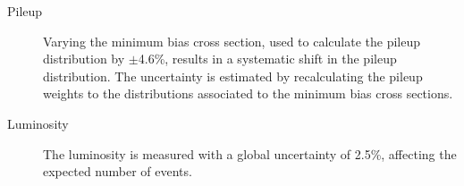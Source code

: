 \begin{description}
	
		\item[Pileup] Varying the minimum bias cross section, used to calculate the pileup distribution by $\pm$4.6\%, results in a systematic shift in the pileup distribution. The uncertainty is estimated by recalculating the pileup weights to the distributions associated to the minimum bias cross sections. 
		
		
		\item[Luminosity] The luminosity  is measured with a global uncertainty of 2.5\%, affecting the expected number of events. 
	
\end{description}

